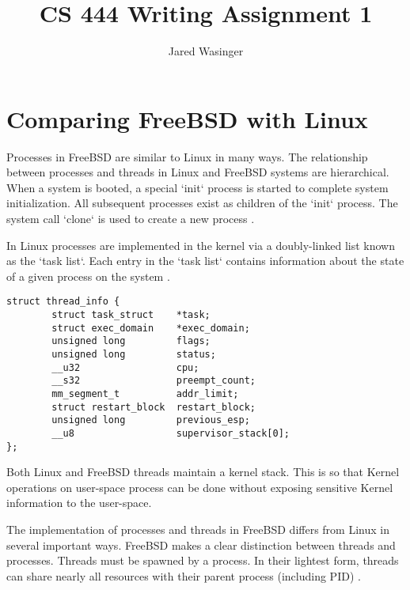 \documentclass[onecolumn,10pt]{IEEETran}
\title{CS 444 Writing Assignment 1}
\author{Jared Wasinger}
\begin{document}
\maketitle

\section{Comparing FreeBSD with Linux}

	Processes in FreeBSD are similar to Linux in many ways.  The relationship between processes and threads in Linux and FreeBSD systems are hierarchical.  When a system is booted, a special `init` process is started to complete system initialization.  All subsequent processes exist as children of the `init` process.  The system call `clone` is used to create a new process \cite{lkd}.

	In Linux processes are implemented in the kernel via a doubly-linked list known as the `task list`.  Each entry in the `task list` contains information about the state of a given process on the system \cite{lkd}.

\begin{lstlisting}
struct thread_info {
        struct task_struct    *task;
        struct exec_domain    *exec_domain;
        unsigned long         flags;
        unsigned long         status;
        __u32                 cpu;
        __s32                 preempt_count;
        mm_segment_t          addr_limit;
        struct restart_block  restart_block;
        unsigned long         previous_esp;
        __u8                  supervisor_stack[0];
};
\end{lstlisting}

	Both Linux and FreeBSD threads maintain a kernel stack.  This is so that Kernel operations on user-space process can be done without exposing sensitive Kernel information to the user-space.

	The implementation of processes and threads in FreeBSD differs from Linux in several important ways.  
	FreeBSD makes a clear distinction between threads and processes.  Threads must be spawned by a process.  In their lightest form, threads can share nearly all resources with their parent process (including PID) \cite{freebsd}.
\end{document}

